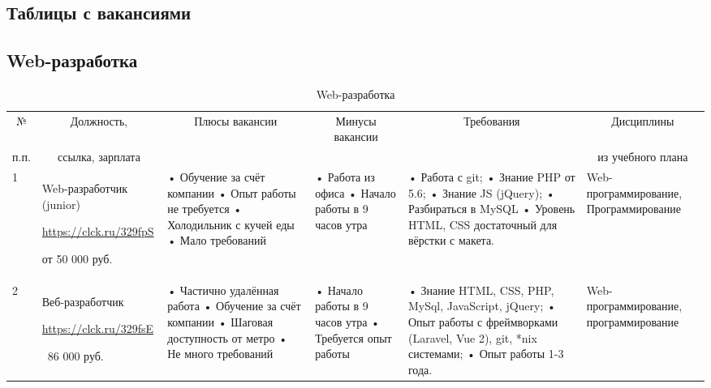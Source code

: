 \begin{landscape}
\section{Таблицы с вакансиями}
\begin{table}[H]
	\subsection{Web-разработка}\caption{Web-разработка}
	\begin{center}
		\begin{small}
		\begin{tabular}{|p{0.1cm}|p{5cm}|p{4.5cm}|p{4.5cm}|p{4cm}|p{3cm}|} \hline
			\multicolumn{1}{|c|}{№}&\multicolumn{1}{c|}{Должность,}&\multicolumn{1}{c|}{Плюсы вакансии}&\multicolumn{1}{c|}{Минусы вакансии}&\multicolumn{1}{c|}{Требования}&\multicolumn{1}{c|}{Дисциплины}\\ 
			\multicolumn{1}{|c|}{п.п.}&\multicolumn{1}{c|}{ссылка, зарплата}&\multicolumn{1}{c|}{}&\multicolumn{1}{c|}{}&\multicolumn{1}{c|}{}&\multicolumn{1}{c|}{из учебного плана}\\ 
			\hline
			1 & Web-разработчик (junior)
			
			\url{https://clck.ru/329fpS}
			
			от 50 000 руб. & 
			• Обучение за счёт компании
			\newline• Опыт работы не требуется
			\newline• Холодильник с кучей еды
			\newline• Мало требований
			&
			• Работа из офиса
			\newline• Начало работы в 9 часов утра
			&
			• Работа с git;
			\newline• Знание PHP от 5.6;
			\newline• Знание JS (jQuery);
			\newline• Разбираться в MySQL
			\newline• Уровень HTML, CSS достаточный для вёрстки с макета.
			&
			Web-программирование, Программирование
			\\
			\hline
			2 & Веб-разработчик
			
    		\url{https://clck.ru/329fsE}
    			
    		~86 000 руб. &
    		• Частично удалённая работа
    		\newline• Обучение за счёт компании
    		\newline• Шаговая доступность от метро
    		\newline• Не много требований
    		&
    		• Начало работы в 9 часов утра
    		\newline• Требуется опыт работы
    		&
    		• Знание HTML, CSS, PHP, MySql, JavaScript, jQuery;
    		\newline• Опыт работы с фреймворками (Laravel, Vue 2), git, *nix системами;
    		\newline• Опыт работы 1-3 года.
    		&
    		Web-программирование, программирование
    		\\
    		\hline
            

\end{tabular}
\end{small}
\end{center}
\end{table}
\end{landscape}
